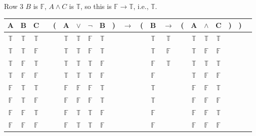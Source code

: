 \documentclass[
  ignorenonframetext,
]{beamer}
\renewcommand{\,}{\text{, }}
\def\True{\mathbb{T}}
\def\False{\mathbb{F}}
\begin{document}
\begin{frame}{Row 3}
\protect\hypertarget{row-3}{}
\(B\) is \(\False\), \(A \wedge C\) is \(\True\), so this is
\(\False \rightarrow \True\), i.e., \(\True\).

\begin{center}

\begin{tabular}{@{ }c@{ }@{ }c@{ }@{ }c | c@{ }@{}c@{}@{ }c@{ }@{ }c@{ }@{ }c@{ }@{ }c@{ }@{}c@{}@{ }c@{ }@{}c@{}@{ }c@{ }@{ }c@{ }@{}c@{}@{ }c@{ }@{ }c@{ }@{ }c@{ }@{}c@{}@{}c@{}@{ }c}
A & B & C &  & ( & A & $\vee$ & $\neg$ & B & ) & $\rightarrow$ & ( & B & $\rightarrow$ & ( & A & $\wedge$ & C & ) & ) & \\
\hline 
 $\True$ & $\True$ & $\True$ &  &  & $\True$ & $\True$ & $\False$ & $\True$ &  &&  & $\True$ & $\True$ &  & $\True$ & $\True$ & $\True$ &  &  & \\
 $\True$ & $\True$ & $\False$ &  &  & $\True$ & $\True$ & $\False$ & $\True$ &  &&  & $\True$ & $\False$ &  & $\True$ & $\False$ & $\False$ &  &  & \\
 $\True$ & $\False$ & $\True$ &  &  & $\True$ & $\True$ & $\True$ & $\False$ &  &&  & $\False$ & $\True$ &  & $\True$ & $\True$ & $\True$ &  &  & \\
 $\True$ & $\False$ & $\False$ &  &  & $\True$ & $\True$ & $\True$ & $\False$ &  &&  & $\False$ &&  & $\True$ & $\False$ & $\False$ &  &  & \\
 $\False$ & $\True$ & $\True$ &  &  & $\False$ & $\False$ & $\False$ & $\True$ &  &&  & $\True$ &&  & $\False$ & $\False$ & $\True$ &  &  & \\
 $\False$ & $\True$ & $\False$ &  &  & $\False$ & $\False$ & $\False$ & $\True$ &  &&  & $\True$ &&  & $\False$ & $\False$ & $\False$ &  &  & \\
 $\False$ & $\False$ & $\True$ &  &  & $\False$ & $\True$ & $\True$ & $\False$ &  &&  & $\False$ &&  & $\False$ & $\False$ & $\True$ &  &  & \\
 $\False$ & $\False$ & $\False$ &  &  & $\False$ & $\True$ & $\True$ & $\False$ &  &&  & $\False$ &&  & $\False$ & $\False$ & $\False$ &  &  & \\
\end{tabular}

\end{center}
\end{frame}
\end{document}
